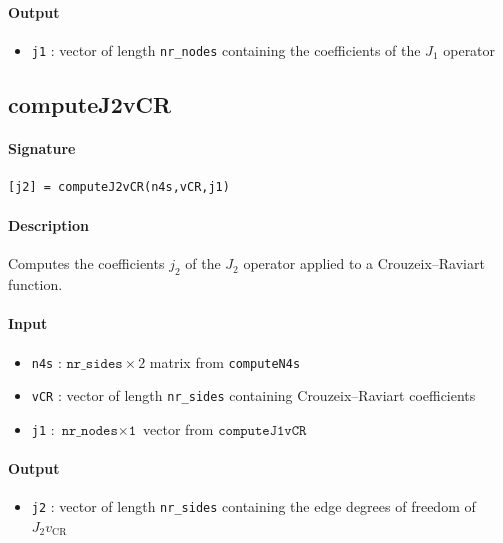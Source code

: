 \documentclass[11pt,a4paper]{article}
\newcommand{\vCR}{v_{\mathrm{CR}}}
\begin{document}
\paragraph{Output}
\begin{itemize}
    \item \texttt{j1} : vector of length \texttt{nr\_nodes} containing the 
          coefficients of the $J_1$ operator
\end{itemize}


\subsection{computeJ2vCR}

\paragraph{Signature}
\begin{verbatim}
[j2] = computeJ2vCR(n4s,vCR,j1)
\end{verbatim}

\paragraph{Description}
Computes the coefficients $j_2$ of the $J_2$ operator applied to a 
Crouzeix--Raviart function.

\paragraph{Input}
\begin{itemize}
    \item \texttt{n4s} : $\texttt{nr\_sides} \times 2$ matrix from \texttt{computeN4s}
    \item \texttt{vCR} : vector of length \texttt{nr\_sides} containing 
          Crouzeix--Raviart coefficients
    \item \texttt{j1} : \(\texttt{nr\_nodes} \times \texttt{1}\) vector from \(\texttt{computeJ1vCR}\)
\end{itemize}

\paragraph{Output}
\begin{itemize}
    \item \texttt{j2} : vector of length \texttt{nr\_sides} containing the 
          edge degrees of freedom of $J_2 \vCR$
\end{itemize}
\end{document}

